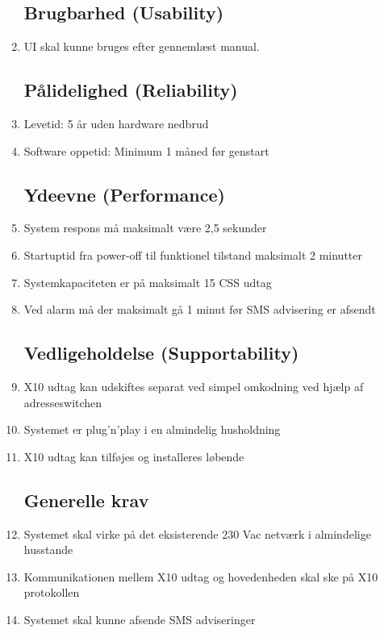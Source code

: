 \begin{enumerate}
	\subsection*{Brugbarhed (Usability)}
	\item UI skal kunne bruges efter gennemlæst manual.


	\subsection*{Pålidelighed (Reliability)}

	\item Levetid: 5 år uden hardware nedbrud
	\item Software oppetid: Minimum 1 måned før genstart


	\subsection*{Ydeevne (Performance)}
	\item System respons må maksimalt være 2,5 sekunder
	\item Startuptid fra power-off til funktionel tilstand maksimalt 2 minutter
	\item Systemkapaciteten er på maksimalt 15 CSS udtag
	\item Ved alarm må der maksimalt gå 1 minut før SMS advisering er afsendt

	\subsection*{Vedligeholdelse (Supportability)}
	\item X10 udtag kan udskiftes separat ved simpel omkodning ved hjælp af adresseswitchen 
	\item Systemet er plug’n’play i en almindelig husholdning
	\item X10 udtag kan tilføjes og installeres løbende

\subsection*{Generelle krav}
	\item Systemet skal virke på det eksisterende 230 Vac netværk i almindelige husstande
	\item Kommunikationen mellem X10 udtag og hovedenheden skal ske på X10 protokollen
	\item Systemet skal kunne afsende SMS adviseringer


\end{enumerate}
